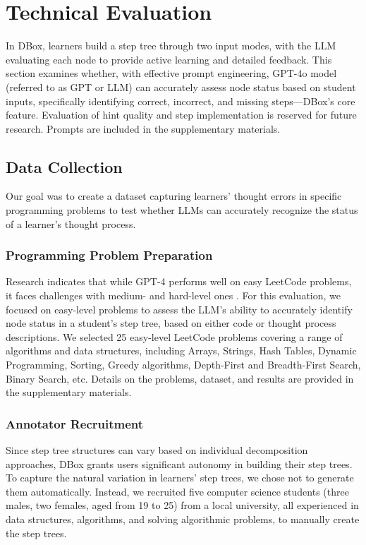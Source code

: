 \section{Technical Evaluation}

In DBox, learners build a step tree through two input modes, with the LLM evaluating each node to provide active learning and detailed feedback. This section examines whether, with effective prompt engineering, GPT-4o model (referred to as GPT or LLM) can accurately assess node status based on student inputs, specifically identifying correct, incorrect, and missing steps—DBox's core feature. Evaluation of hint quality and step implementation is reserved for future research. Prompts are included in the supplementary materials.


\subsection{Data Collection} Our goal was to create a dataset capturing learners' thought errors in specific programming problems to test whether LLMs can accurately recognize the status of a learner’s thought process.

\subsubsection{Programming Problem Preparation}
Research indicates that while GPT-4 performs well on easy LeetCode problems, it faces challenges with medium- and hard-level ones \cite{finnie2023my, savelka2023thrilled}. For this evaluation, we focused on easy-level problems to assess the LLM’s ability to accurately identify node status in a student's step tree, based on either code or thought process descriptions. We selected 25 easy-level LeetCode problems covering a range of algorithms and data structures, including Arrays, Strings, Hash Tables, Dynamic Programming, Sorting, Greedy algorithms, Depth-First and Breadth-First Search, Binary Search, etc. Details on the problems, dataset, and results are provided in the supplementary materials.

\subsubsection{Annotator Recruitment}
Since step tree structures can vary based on individual decomposition approaches, DBox grants users significant autonomy in building their step trees. To capture the natural variation in learners' step trees, we chose not to generate them automatically. Instead, we recruited five computer science students (three males, two females, aged from 19 to 25) from a local university, all experienced in data structures, algorithms, and solving algorithmic problems, to manually create the step trees.








